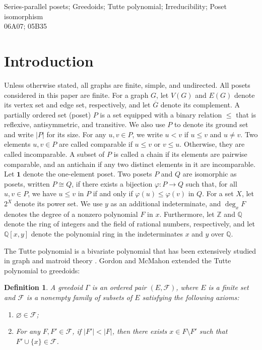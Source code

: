 \documentclass[11pt,a4paper]{article}
\newtheorem{definition}{Definition}[section]
\begin{document}
{}  Series-parallel posets; Greedoids; Tutte polynomial; Irreducibility; Poset isomorphism \\
  06A07; 05B35

\section{Introduction}

Unless otherwise stated, all graphs are finite, simple, and undirected.
All posets considered in this paper are finite.
For a graph $G$, let $V(G)$ and $E(G)$ denote its vertex set and edge set, respectively, 
and let $\overline{G}$ denote its complement.
A partially ordered set (poset) $P$ is a set equipped with a binary relation $\leq$ that is reflexive, antisymmetric, and transitive.
We also use $P$ to denote its ground set and write $|P|$ for its size.
For any $u,v\in P$, we write $u<v$ if $u\leq v$ and $u\neq v$.
Two elements $u,v\in P$ are called comparable if $u\leq v$ or $v\leq u$.
Otherwise, they are called incomparable.
A subset of $P$ is called a chain if its elements are pairwise comparable,
and an antichain if any two distinct elements in it are incomparable.
Let $\mathbf{1}$ denote the one-element poset.
Two posets $P$ and $Q$ are isomorphic as posets, written
$P\cong Q$, if there exists a bijection $\varphi:P\to Q$ such that,
for all $u,v\in P$, we have $u\leq v$ in $P$ if and only if
$\varphi(u)\leq\varphi(v)$ in $Q$.
For a set $X$, let $2^X$ denote its power set.
We use $y$ as an additional indeterminate, and $\deg_x F$
denotes the degree of a nonzero polynomial $F$ in $x$.
Furthermore, let $\mathbb{Z}$ and $\mathbb{Q}$ denote the ring of integers and the field of rational numbers, respectively, 
and let $\mathbb{Q}[x,y]$ denote the polynomial ring in the indeterminates $x$ and $y$ over $\mathbb{Q}$.

The Tutte polynomial is a bivariate polynomial that has been extensively studied in graph and matroid theory
\cite{BauerEtAl2026, BrylawskiOxley1992, ChaudharyGordon1991, ColbournProvanVertigan1995}.
Gordon and McMahon \cite{GordonMcMahon1989} extended the Tutte polynomial to greedoids:

\begin{definition}\label{def:greedoid}
A greedoid $\Gamma$ is an ordered pair $(E,\mathcal F)$, where $E$ is a finite set 
and $\mathcal F$ is a nonempty family of subsets of $E$ satisfying the following axioms:
\begin{enumerate}
 \item[\textup{(i)}] $\varnothing\in\mathcal F$;
 \item[\textup{(ii)}] For any $F,F'\in\mathcal F$, if $|F'|<|F|$, 
 then there exists $x\in F\setminus F'$ such that $F'\cup\{x\}\in\mathcal F$.
\end{enumerate}
\end{definition}
\end{document}

